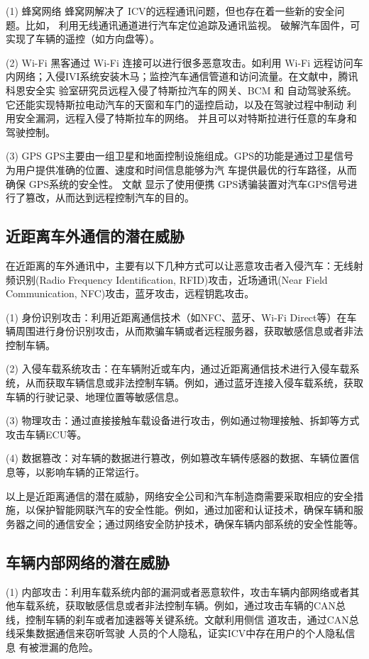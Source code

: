(1) 蜂窝网络
蜂窝网解决了 ICV的远程通讯问题，但也存在着一些新的安全问题。比如，
利用无线通讯通道进行汽车定位追踪及通讯监视。
破解汽车固件，可实现了车辆的遥控（如方向盘等）。


(2) Wi-Fi
黑客通过 Wi-Fi 连接可以进行很多恶意攻击。如利用 Wi-Fi 远程访问车内网络；入侵IVI系统安装木马；监控汽车通信管道和访问流量。在文献\cite{keen}中，腾讯科恩安全实
验室研究员远程入侵了特斯拉汽车的网关、BCM 和
自动驾驶系统。它还能实现特斯拉电动汽车的天窗和车门的遥控启动，以及在驾驶过程中制动
利用安全漏洞，远程入侵了特斯拉车的网络。
并且可以对特斯拉进行任意的车身和驾驶控制。

(3) GPS
GPS主要由一组卫星和地面控制设施组成。GPS的功能是通过卫星信号为用户提供准确的位置、速度和时间信息能够为汽
车提供最优的行车路径，从而确保 GPS系统的安全性。
文献\cite{cuigai}
显示了使用便携 GPS诱骗装置对汽车GPS信号进行了篡改，从而达到远程控制汽车的目的。

\subsection{近距离车外通信的潜在威胁}
在近距离的车外通讯中，主要有以下几种方式可以让恶意攻击者入侵汽车：无线射频识别(Radio Frequency Identification, RFID)攻击，近场通讯(Near Field Communication, NFC)攻击，蓝牙攻击，远程钥匙攻击。

(1) 身份识别攻击：利用近距离通信技术（如NFC、蓝牙、Wi-Fi Direct等）在车辆周围进行身份识别攻击，从而欺骗车辆或者远程服务器，获取敏感信息或者非法控制车辆。

(2) 入侵车载系统攻击：在车辆附近或车内，通过近距离通信技术进行入侵车载系统，从而获取车辆信息或非法控制车辆。例如，通过蓝牙连接入侵车载系统，获取车辆的行驶记录、地理位置等敏感信息。

(3) 物理攻击：通过直接接触车载设备进行攻击，例如通过物理接触、拆卸等方式攻击车辆ECU等。

(4) 数据篡改：对车辆的数据进行篡改，例如篡改车辆传感器的数据、车辆位置信息等，以影响车辆的正常运行。

以上是近距离通信的潜在威胁，网络安全公司和汽车制造商需要采取相应的安全措施，以保护智能网联汽车的安全性能。例如，通过加密和认证技术，确保车辆和服务器之间的通信安全；通过网络安全防护技术，确保车辆内部系统的安全性能等。

\subsection{车辆内部网络的潜在威胁}
(1) 内部攻击：利用车载系统内部的漏洞或者恶意软件，攻击车辆内部网络或者其他车载系统，获取敏感信息或者非法控制车辆。例如，通过攻击车辆的CAN总线，控制车辆的刹车或者加速器等关键系统。文献\cite{koscher2010experimental}利用侧信
道攻击，通过CAN总线采集数据通信来窃听驾驶
人员的个人隐私，证实ICV中存在用户的个人隐私信息
有被泄漏的危险。


